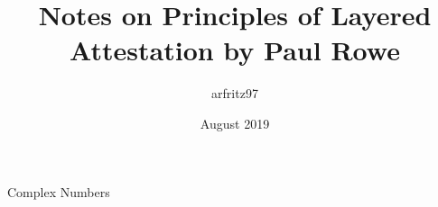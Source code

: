 \documentclass{article}
\title{Notes on Principles of Layered Attestation by Paul Rowe}
\author{arfritz97 }
\date{August 2019}
\begin{document}
Complex Numbers
\end{document}
